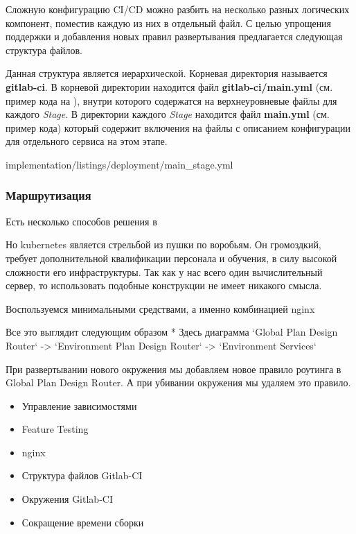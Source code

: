 Сложную конфигурацию CI/CD можно разбить на несколько разных логических компонент, поместив каждую из них
в отдельный файл. С целью упрощения поддержки и добавления новых правил развертывания предлагается следующая структура файлов.


Данная структура является иерархической.
Корневая директория называется \textbf{gitlab-ci}. В корневой директории находится файл \textbf{gitlab-ci/main.yml}
(см. пример кода на ),
внутри которого содержатся на верхнеуровневые файлы для каждого \textit{Stage}.
В директории каждого \textit{Stage} находится файл \textbf{main.yml} (см. пример кода)
который содержит включения на файлы
с описанием конфигурации для отдельного сервиса на этом этапе.


\vskip 5mm


{implementation/listings/deployment/main_stage.yml}
\vskip 5mm

\subsubsection{{Маршрутизация}}

Есть несколько способов решения в

Но kubernetes является стрельбой из пушки по воробьям.
Он громоздкий, требует дополнительной квалификации персонала и обучения, в силу высокой сложности его инфраструктуры.
Так как у нас всего один вычислительный сервер, то использовать подобные конструкции не имеет никакого смысла.


Воспользуемся минимальными средствами, а именно комбинацией nginx

Все это выглядит следующим образом
* Здесь диаграмма `Global Plan Design Router` -> `Environment Plan Design Router` -> `Environment Services`

При развертывании нового окружения мы добавляем новое правило роутинга в Global Plan Design Router.
А при убивании окружения мы удаляем это правило.


\begin{itemize}
    \item Управление зависимостями
    \item Feature Testing
    \item nginx
    \item Структура файлов Gitlab-CI
    \item Окружения Gitlab-CI
    \item Сокращение времени сборки
\end{itemize}
